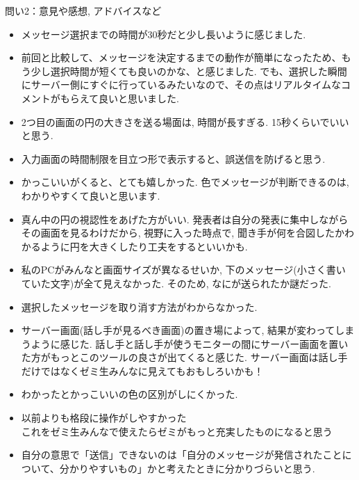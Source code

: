 \documentclass{funthesis}
\begin{document}
問い2：意見や感想, アドバイスなど\\
\begin{itemize}
 \item メッセージ選択までの時間が30秒だと少し長いように感じました.\\
 \item 前回と比較して、メッセージを決定するまでの動作が簡単になったため、もう少し選択時間が短くても良いのかな、と感じました. でも、選択した瞬間にサーバー側にすぐに行っているみたいなので、その点はリアルタイムなコメントがもらえて良いと思いました.\\
 \item 2つ目の画面の円の大きさを送る場面は, 時間が長すぎる. 15秒くらいでいいと思う.\\
 \item 入力画面の時間制限を目立つ形で表示すると、誤送信を防げると思う.\\
 \item かっこいいがくると、とても嬉しかった. 色でメッセージが判断できるのは, わかりやすくて良いと思います.\\
 \item 真ん中の円の視認性をあげた方がいい. 発表者は自分の発表に集中しながらその画面を見るわけだから, 視野に入った時点で, 聞き手が何を合図したかわかるように円を大きくしたり工夫をするといいかも.\\
 \item 私のPCがみんなと画面サイズが異なるせいか, 下のメッセージ(小さく書いていた文字)が全て見えなかった. そのため, なにが送られたか謎だった. \\
 \item 選択したメッセージを取り消す方法がわからなかった. 
 \item サーバー画面(話し手が見るべき画面)の置き場によって, 結果が変わってしまうように感じた. 話し手と話し手が使うモニターの間にサーバー画面を置いた方がもっとこのツールの良さが出てくると感じた. サーバー画面は話し手だけではなくゼミ生みんなに見えてもおもしろいかも！\\
 \item わかったとかっこいいの色の区別がしにくかった.\\
 \item 以前よりも格段に操作がしやすかった\\これをゼミ生みんなで使えたらゼミがもっと充実したものになると思う\\
 \item 自分の意思で「送信」できないのは「自分のメッセージが発信されたことについて、分かりやすいもの」かと考えたときに分かりづらいと思う.\\

\end{itemize}
\end{document}
